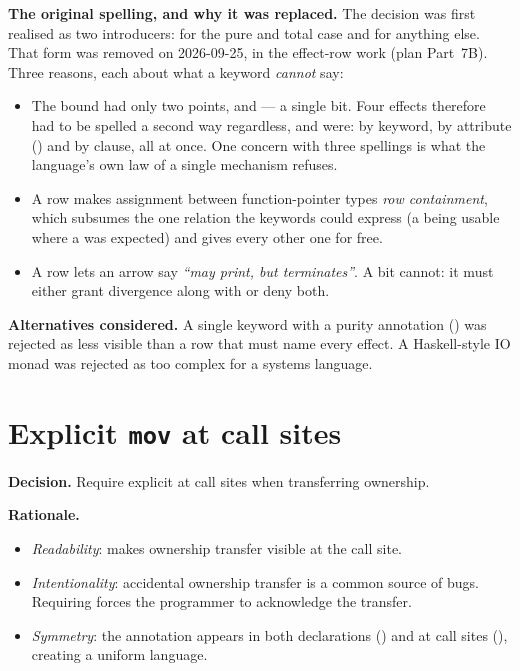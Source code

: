 \pnum
\textbf{The original spelling, and why it was replaced.}  The decision was first
realised as two introducers:  for the pure and total case and
 for anything else.  That form was removed on 2026-09-25, in the
effect-row work (plan Part~7B).  Three reasons, each about what a keyword
\emph{cannot} say:
\begin{itemize}
  \item The bound had only two points,  and  --- a single
        bit.  Four effects therefore had to be spelled a second way regardless,
        and were: by keyword, by attribute () and by clause, all
        at once.  One concern with three spellings is what the language's own law
        of a single mechanism refuses.
  \item A row makes assignment between function-pointer types \emph{row
        containment}, which subsumes the one relation the keywords could express
        (a  being usable where a  was expected) and gives
        every other one for free.
  \item A row lets an arrow say \emph{``may print, but terminates''}.  A bit
        cannot: it must either grant divergence along with  or deny
        both.
\end{itemize}

\pnum
\textbf{Alternatives considered.}
A single keyword with a purity annotation () was rejected as less
visible than a row that must name every effect.  A Haskell-style IO monad was
rejected as too complex for a systems language.

\section{Explicit \texttt{mov} at call sites}
\label{sec:rationale.mov}

\pnum
\textbf{Decision.}  Require explicit  at call sites when
transferring ownership.

\pnum
\textbf{Rationale.}
\begin{itemize}
  \item \textit{Readability}:  makes ownership
        transfer visible at the call site.
  \item \textit{Intentionality}: accidental ownership transfer is a
        common source of bugs.  Requiring  forces the
        programmer to acknowledge the transfer.
  \item \textit{Symmetry}: the annotation appears in both declarations
        () and at call sites (), creating a
        uniform language.
\end{itemize}

